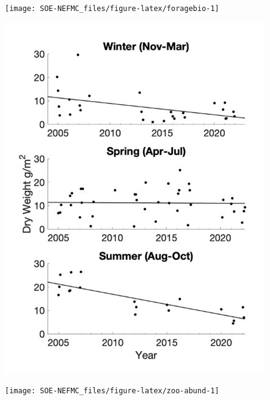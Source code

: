 \documentclass[
  10pt,
]{article}
\let\origfigure\figure
\let\endorigfigure\endfigure
\renewenvironment{figure}[1][2] {
    \expandafter\origfigure\expandafter[H]
} {
    \endorigfigure
}
\begin{document}
\begin{figure}

{\centering \texttt{[image: SOE-NEFMC\_files/figure-latex/foragebio-1]} 

}

\caption{Forage fish index in GB (left) and GOM (right) for spring (blue) and fall (red) surveys. Index values are relative to the maximum observation within a region across surveys.}\label{fig:foragebio}
\end{figure}
\begin{figure}

{\centering \includegraphics{SOE-NEFMC_files/figure-latex/zooplankton-season-1} 

}

\caption{Seasonal indices of dry mass of mesozooplankton captured with a 200µm ring net towed from the bottom to surface at a deep time series station  in Wilkinson Basin between 2005-2022 (Runge et al. 2023).}\label{fig:zooplankton-season}
\end{figure}
\begin{figure}

{\centering \texttt{[image: SOE-NEFMC\_files/figure-latex/zoo-abund-1]} 

}

\caption{Georges Bank (GB) and Gulf of Maine (GOM) abundance anomalies three dominante zooplankton (\textit{Calanus finmarchicus}, \textit{Calanus typicus}, and \textit{Pseudocalanus spp}.).}\label{fig:zoo-abund}
\end{figure}
\end{document}
